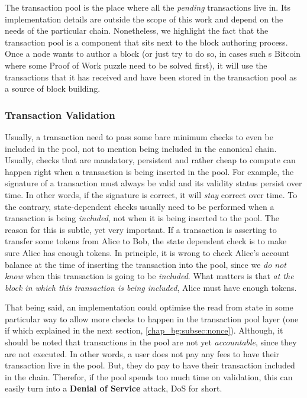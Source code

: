The transaction pool is the place where all the \textit{pending} transactions live in. Its
implementation details are outside the scope of this work and depend on the needs of the particular
chain. Nonetheless, we highlight the fact that the transaction pool is a component that sits next to
the block authoring process. Once a node wants to author a block (or just try to do so, in cases
such s Bitcoin where some Proof of Work puzzle need to be solved first), it will use the
transactions that it has received and have been stored in the transaction pool as a source of block
building.

\subsubsection{Transaction Validation} \label{chap_bg:subsec:validation}

Usually, a transaction need to pass some bare minimum checks to even be included in the pool, not to
mention being included in the canonical chain. Usually, checks that are mandatory, persistent and
rather cheap to compute can happen right when a transaction is being inserted in the pool. For
example, the signature of a transaction must always be valid and its validity status persist over
time. In other words, if the signature is correct, it will \textit{stay} correct over time. To the
contrary, state-dependent checks usually need to be performed when a transaction is being
\textit{included}, not when it is being inserted to the pool. The reason for this is subtle, yet
very important. If a transaction is asserting to transfer some tokens from Alice to Bob, the state
dependent check is to make sure Alice has enough tokens. In principle, it is wrong to check Alice's
account balance at the time of inserting the transaction into the pool, since we \textit{do not
know} when this transaction is going to be \textit{included}. What matters is that \textit{at the
block in which this transaction is being included}, Alice must have enough tokens.

That being said, an implementation could optimise the read from state in some particular way to
allow more checks to happen in the transaction pool layer (one if which explained in the next
section, \ref{chap_bg:subsec:nonce}). Although, it should be noted that transactions in the pool are
not yet \textit{accountable}, since they are not executed. In other words, a user does not pay any
fees to have their transaction live in the pool. But, they do pay to have their transaction included
in the chain. Therefor, if the pool spends too much time on validation, this can easily turn into a
\textbf{Denial of Service} attack, DoS for short.

